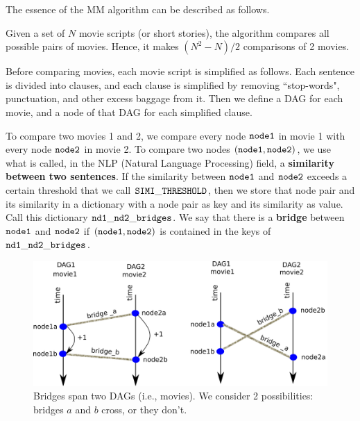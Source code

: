 \documentclass[12pt]{article}
\begin{document}
The essence of the MM algorithm can be described as follows.

Given a set of $N$ movie scripts (or short stories),
the algorithm compares all possible pairs of movies.
Hence, it makes $(N^2-N)/2$
 comparisons of 2 movies.

Before comparing movies, each movie script is simplified as follows.
Each sentence is divided into clauses,
and each clause is simplified by removing
``stop-words", punctuation,  and other excess baggage from it.
Then we define a DAG for each movie, and a node of that DAG for each
simplified clause. 

To compare two movies 1 and 2,
we compare every node $\tt node1$
in movie 1 with every node $\tt node2$ in movie 2.
To compare two nodes $\tt (node1, node2)$,
we use what is called, in the NLP (Natural Language Processing)
field, a {\bf similarity between two sentences}. 
If the similarity
between $\tt node1$ and $\tt node2$ exceeds a certain threshold
that we call $\tt SIMI\_THRESHOLD$,
then we store that node pair and its
similarity in a dictionary with
a node pair as key and its similarity 
as value. Call this dictionary $\tt nd1\_nd2\_bridges$.
We say that there is a {\bf bridge} 
between $\tt node1$ and $\tt node2$
if $\tt (node1, node2)$ is contained 
in the keys of $\tt nd1\_nd2\_bridges$.

\begin{figure}[h!]
\centering
\includegraphics[width=5in]
{crossing-bridges.png}
\caption{Bridges span two DAGs (i.e., movies). We consider 2 possibilities:
bridges $a$ and $b$ cross,
or they don't. 
}
\label{fig-crossing-bridges}
\end{figure}
\end{document}
